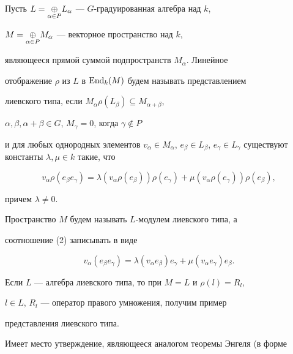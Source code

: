\begin{defn} 


Пусть $L=\underset{\alpha\in P}{\oplus}{} L_\alpha$ --- $G$-градуированная алгебра над $k$, 


$M=\underset{\alpha\in P}{\oplus}{} M_\alpha$ --- векторное пространство над $k$, 


являющееся прямой суммой подпространств $M_\alpha$. Линейное 


отображение $\rho$ из $L$ в $\operatorname{End}_k(M)$ будем называть представлением 


лиевского типа, если $M_\alpha\rho(L_\beta)\subseteq M_{\alpha+\beta}$, 


$\alpha,\beta,\alpha+\beta\in G$, $M_\gamma=0$, когда $\gamma\notin P$ 


и для любых однородных элементов $v_\alpha\in M_\alpha$, $e_\beta\in 


L_\beta$, $e_\gamma\in L_\gamma$ существуют константы $\lambda,\mu\in 


k$ такие, что 


\begin{equation} 


v_\alpha\rho(e_\beta e_\gamma)=\lambda(v_\alpha \rho(e_\beta)) 


\rho(e_\gamma)+\mu(v_\alpha\rho(e_\gamma))\rho(e_\beta), 


\end{equation} 


причем $\lambda\ne0$. 


\end{defn} 


 


Пространство $M$ будем называть $L$-модулем лиевского типа, а 


соотношение (2) записывать в виде 


$$


v_\alpha(e_\beta e_\gamma)=\lambda(v_\alpha e_\beta) 


e_\gamma+\mu(v_\alpha e_\gamma)e_\beta.


$$


 


Если $L$ --- алгебра лиевского типа, то при $M=L$ и $\rho(l)=R_l$, 


$l\in L$, $R_l$ --- оператор правого умножения, получим пример 


представления лиевского типа. 


 


Имеет место утверждение, являющееся аналогом теоремы Энгеля (в форме 



